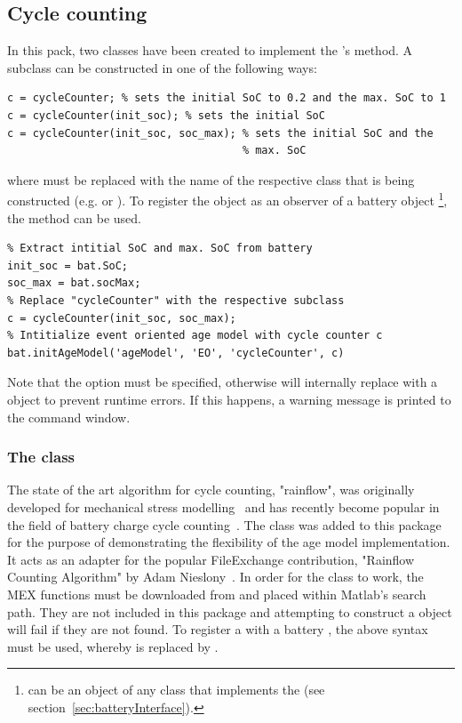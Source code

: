 \subsection{Cycle counting}
\label{sec:cycleCounting}
In this pack, two classes have been created to implement the 's  method.
A  subclass can be constructed in one of the following ways:
\begin{lstlisting}
c = cycleCounter; % sets the initial SoC to 0.2 and the max. SoC to 1
c = cycleCounter(init_soc); % sets the initial SoC
c = cycleCounter(init_soc, soc_max); % sets the initial SoC and the
									 % max. SoC
\end{lstlisting}
where  must be replaced with the name of the respective class that is being constructed (e.g.  or ). To register the object as an observer of a battery object \footnote{ can be an object of any class that implements the  (see section~\ref{sec:batteryInterface}).}, the  method can be used.
\begin{lstlisting}
% Extract intitial SoC and max. SoC from battery
init_soc = bat.SoC;
soc_max = bat.socMax;
% Replace "cycleCounter" with the respective subclass
c = cycleCounter(init_soc, soc_max);
% Intitialize event oriented age model with cycle counter c
bat.initAgeModel('ageModel', 'EO', 'cycleCounter', c)
\end{lstlisting}
Note that the  option must be specified, otherwise  will internally replace  with a  object to prevent runtime errors. If this happens, a warning message is printed to the command window.

\subsubsection{The  class}
The state of the art algorithm for cycle counting, "rainflow", was originally developed for mechanical stress modelling~\cite{matsuishi_fatigue_1968} and has recently become popular in the field of battery charge cycle counting~\cite{dufo-lopez_multi-objective_2008}. The  class was added to this package for the purpose of demonstrating the flexibility of the age model implementation. It acts as an adapter for the popular FileExchange contribution, "Rainflow Counting Algorithm" by Adam Nieslony~\cite{_rainflow_????}. In order for the class to work, the MEX functions must be downloaded from \cite{nieslony_rainflow_2010} and placed within Matlab's search path. They are not included in this package and attempting to construct a  object will fail if they are not found. To register a  with a battery , the above syntax must be used, whereby  is replaced by .

